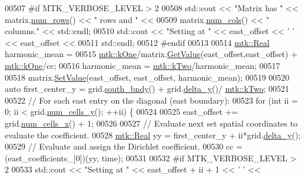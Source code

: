 \begin{DoxyCode}
00507 \textcolor{preprocessor}{  #if MTK\_VERBOSE\_LEVEL > 2}
00508   std::cout << \textcolor{stringliteral}{"Matrix has "} << matrix.\hyperlink{classmtk_1_1DenseMatrix_a53f3afb3b6a8d21854458aaa9663cc74}{num\_rows}() << \textcolor{stringliteral}{" rows and "} <<
00509     matrix.\hyperlink{classmtk_1_1DenseMatrix_a41747502d468c6728a4be31501b16e0e}{num\_cols}() << \textcolor{stringliteral}{" columns."} << std::endl;
00510   std::cout << \textcolor{stringliteral}{"Setting at "} << east\_offset << \textcolor{charliteral}{' '} << east\_offset <<
00511     std::endl;
00512 \textcolor{preprocessor}{  #endif}
00513 
00514   \hyperlink{group__c01-roots_gac080bbbf5cbb5502c9f00405f894857d}{mtk::Real} harmonic\_mean =
00515     \hyperlink{group__c01-roots_ga26407c24d43b6b95480943340d285c71}{mtk::kOne}/matrix.\hyperlink{classmtk_1_1DenseMatrix_a4b23ecbebd970b5eea915dbb50691024}{GetValue}(east\_offset,east\_offset) + 
      \hyperlink{group__c01-roots_ga26407c24d43b6b95480943340d285c71}{mtk::kOne}/cc;
00516   harmonic\_mean = \hyperlink{group__c01-roots_gaf39c2d851a2db744f4feb1c5ab3ec2cf}{mtk::kTwo}/harmonic\_mean;
00517 
00518   matrix.\hyperlink{classmtk_1_1DenseMatrix_a784ce5784109ac86bfb9d8562b334b13}{SetValue}(east\_offset, east\_offset, harmonic\_mean);
00519 
00520   \textcolor{keyword}{auto} first\_center\_y = grid.\hyperlink{classmtk_1_1UniStgGrid2D_a1442eaf219f099d0ebf46a170fdebf92}{south\_bndy}() + grid.\hyperlink{classmtk_1_1UniStgGrid2D_a65a78cfc80ffdbeb282ed57af4dc5cb4}{delta\_y}()/
      \hyperlink{group__c01-roots_gaf39c2d851a2db744f4feb1c5ab3ec2cf}{mtk::kTwo};
00521 
00522   \textcolor{comment}{// For each east entry on the diagonal (east boundary):}
00523   \textcolor{keywordflow}{for} (\textcolor{keywordtype}{int} ii = 0; ii < grid.\hyperlink{classmtk_1_1UniStgGrid2D_aed05a801cc9a76dba0ff203cea58a61a}{num\_cells\_y}(); ++ii) \{
00524 
00525     east\_offset += grid.\hyperlink{classmtk_1_1UniStgGrid2D_a2d182866a398aba8e4829590e85bf939}{num\_cells\_x}() + 1;
00526 
00527     \textcolor{comment}{// Evaluate next set spatial coordinates to evaluate the coefficient.}
00528     \hyperlink{group__c01-roots_gac080bbbf5cbb5502c9f00405f894857d}{mtk::Real} yy = first\_center\_y + ii*grid.\hyperlink{classmtk_1_1UniStgGrid2D_a65a78cfc80ffdbeb282ed57af4dc5cb4}{delta\_y}();
00529     \textcolor{comment}{// Evaluate and assign the Dirichlet coefficient.}
00530     cc = (east\_coefficients\_[0])(yy, time);
00531 
00532 \textcolor{preprocessor}{    #if MTK\_VERBOSE\_LEVEL > 2}
00533     std::cout << \textcolor{stringliteral}{"Setting at "} << east\_offset + ii + 1 << \textcolor{charliteral}{' '} <<

\end{DoxyCode}
